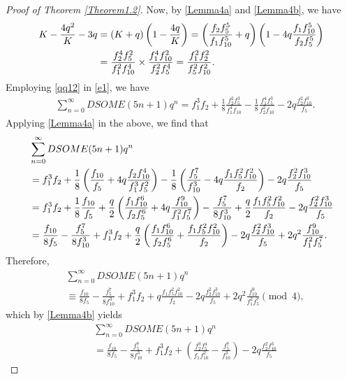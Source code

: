 \documentclass[10pt,a4paper]{amsart}
\begin{document}
\begin{proof}[Proof of Theorem \ref{Theorem1.2}]
Now, by \eqref{Lemma4a} and \eqref{Lemma4b}, we have
    \begin{align}
       \label{qq12} K-\frac{4q^2}{K}-3q&=\left(K+q\right)\left(1-\frac{4q}{K}\right)=\left(\frac{f_{2}f_{5}^{5}}{f_{1}f_{10}^{5}}+q\right)\left(1-4q\frac{f_{1}f_{10}^{5}}{f_{2}f_{5}^{5}}\right)\\
    &=\frac{f_{2}^{4}f_{5}^{2}}{f_{1}^{2}f_{10}^{4}}\times\frac{f_{1}^{4}f_{10}^{2}}{f_{2}^{2}f_{5}^{4}}=\frac{f_{1}^{2}f_{2}^{2}}{f_{5}^{2}f_{10}^{2}}.\notag
    \end{align}
  Employing \eqref{qq12} in \eqref{e1}, we have
    \begin{align}
&\sum_{n=0}^{\infty}DSOME(5n+1)q^n=f_{1}^{3}f_{2}+\frac{1}{8}\frac{f_{2}^{2}f_{5}^{3}}{f_{1}^{4}f_{10}}-\frac{1}{8}\frac{f_{1}^{4}f_{5}^{3}}{f_{2}^{2}f_{10}}-2q\frac{f_{2}^{2}f_{10}^{3}}{f_{5}}.\end{align}
Applying \eqref{Lemma4a} in the above, we find that
\begin{align}\label{c8}&\sum_{n=0}^{\infty}DSOME(5n+1)q^n\\
&=f_{1}^{3}f_{2}+\frac{1}{8}\left(\frac{f_{10}}{f_{5}}+4q\frac{f_{2}f_{10}^{4}}{f_{1}^{3}f_{5}^{2}}\right)-\frac{1}{8}\left(\frac{f_{5}^{7}}{f_{10}^{3}}-4q\frac{f_{1}f_{5}^{2}f_{10}^{2}}{f_{2}}\right)-2q\frac{f_{2}^{2}f_{10}^{3}}{f_{5}}\notag\\
&=f_{1}^{3}f_{2}+\frac{1}{8}\frac{f_{10}}{f_5}+\frac{q}{2}\left(\frac{f_{1}f_{10}^{6}}{f_{2}f_{5}^{6}}+4q\frac{f_{10}^{9}}{f_{1}^{2}f_{5}^{7}}\right)-\frac{f_{5}^{7}}{8f_{10}^{3}}+\dfrac{q}{2}\frac{f_{1}f_{5}^{2}f_{10}^{2}}{f_{2}}-2q\frac{f_{2}^{2}f_{10}^{3}}{f_{5}}\notag\\
&=\frac{f_{10}}{8f_5}-\frac{f_5^7}{8f^3_{10}}+f_1^3f_2
+\dfrac{q}{2}\left(\frac{f_{1}f_{10}^6}{f_2f_5^6}+\frac{f_{1}f_5^2f_{10}^2}{f_2}\right)-2q\frac{f_{2}^{2}f_{10}^{3}}{f_{5}}
+2q^2\frac{f_{10}^{9}}{f_{1}^{2}f_{5}^{7}}.\notag
\end{align}
Therefore, 
\begin{align*}&\sum_{n=0}^{\infty}DSOME(5n+1)q^n\\
&\equiv\frac{f_{10}}{8f_5}-\frac{f_5^7}{8f^3_{10}}+f_1^3f_2
+q\frac{f_{1}f_5^2f_{10}^2}{f_2}-2q\frac{f_{2}^{2}f_{10}^{3}}{f_{5}}
+2q^2\frac{f_{10}^{9}}{f_{1}^{2}f_{5}^{7}}\pmod{4},
\end{align*}
which by \eqref{Lemma4b} yields
\begin{align*}&\sum_{n=0}^{\infty}DSOME(5n+1)q^n\\
&=\frac{f_{10}}{8f_5}-\frac{f_5^7}{8f^3_{10}}+f_1^3f_2
+\left(\frac{f_2^3f_5^4}{f_1f_{10}^2}-\frac{f_5^7}{f_{10}^3}\right)-2q\frac{f_{2}^{2}f_{10}^{3}}{f_{5}}

\end{align*}
\end{proof}
\end{document}
